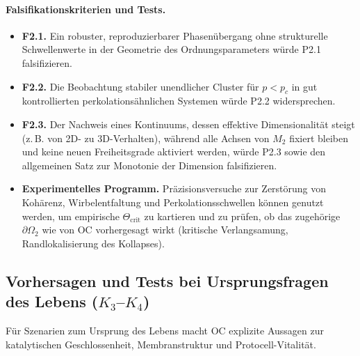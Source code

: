 {\paragraph{Falsifikationskriterien und Tests.}
\begin{itemize}
  \item \textbf{F2.1.}
        Ein robuster, reproduzierbarer Phasenübergang ohne strukturelle
        Schwellenwerte in der Geometrie des Ordnungsparameters würde P2.1 falsifizieren.
  \item \textbf{F2.2.}
        Die Beobachtung stabiler unendlicher Cluster für \(p<p_c\) in
        gut kontrollierten perkolationsähnlichen Systemen würde P2.2 widersprechen.
  \item \textbf{F2.3.}
        Der Nachweis eines Kontinuums, dessen effektive Dimensionalität steigt
        (z.\,B. von 2D- zu 3D-Verhalten), während alle Achsen von \(M_2\) fixiert bleiben
        und keine neuen Freiheitsgrade aktiviert werden, würde P2.3 sowie den allgemeinen
        Satz zur Monotonie der Dimension falsifizieren.
  \item \textbf{Experimentelles Programm.}
        Präzisionsversuche zur Zerstörung von Kohärenz, Wirbelentfaltung
        und Perkolationsschwellen können genutzt werden, um empirische
        \(\Theta_{\mathrm{crit}}\) zu kartieren und zu prüfen, ob das zugehörige
        \(\partial\Omega_2\) wie von OC vorhergesagt wirkt
        (kritische Verlangsamung, Randlokalisierung des Kollapses).
\end{itemize}

\subsection{Vorhersagen und Tests bei Ursprungsfragen des Lebens
            (\texorpdfstring{$K_3$}{K\_3}--\texorpdfstring{$K_4$}{K\_4})}

Für Szenarien zum Ursprung des Lebens macht OC explizite Aussagen zur
katalytischen Geschlossenheit, Membranstruktur und Protocell-Vitalität.

}
